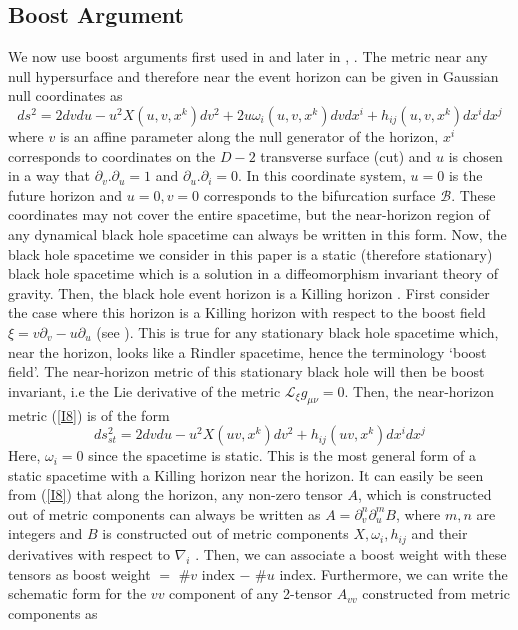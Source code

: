 \documentclass[12pt]{article}
\begin{document}
\subsection{Boost Argument}
We now use boost arguments first used in \cite{Wall} and later in \cite{SPANMS}, \cite{BBDK}.
The metric near any null hypersurface and therefore near the event horizon can be given in Gaussian null coordinates as
\begin{equation}\label{I8}
ds^2= 2dv du -u^2 X(u,v,x^{k}) dv^2 + 2 u \omega_{i}(u,v,x^{k}) dv dx^{i} + h_{ij}(u,v,x^{k})dx^{i} dx^{j}
\end{equation}
where $v$ is an affine parameter along the null generator of the horizon, $x^{i}$ corresponds to coordinates on the $D-2$ transverse surface (cut) and $u$ is chosen in a way that $\partial_v. \partial_u=1$ and $\partial_u. \partial_i=0$. In this coordinate system, $u=0$ is the future horizon and $u=0, v=0$ corresponds to the bifurcation surface $\mathcal{B}$. These coordinates may not cover the entire spacetime, but the near-horizon region of any dynamical black hole spacetime can always be written in this form. Now, the black hole spacetime we consider in this paper is a static (therefore stationary) black hole spacetime which is a solution in a diffeomorphism invariant theory of gravity. Then, the black hole event horizon is a Killing horizon \cite{Wald}. First consider the case where this horizon is a Killing horizon with respect to the boost field $\xi= v\partial_v - u\partial_u $ (see \cite{SPANMS}). This is true for any stationary black hole spacetime which, near the horizon, looks like a Rindler spacetime, hence the terminology `boost field'. The near-horizon metric of this stationary black hole will then be boost invariant, i.e the Lie derivative of the metric $\mathcal{L}_{\xi} g_{\mu \nu}=0$.
Then, the near-horizon metric (\ref{I8}) is of the form
\begin{equation}\label{I9}
ds^2_{st}= 2dv du -u^2 X(uv,x^{k}) dv^2 + h_{ij}(uv,x^{k})dx^{i} dx^{j}
\end{equation}
Here, $\omega_{i} = 0$ since the spacetime is static.
This is the most general form of a static spacetime with a Killing horizon near the horizon.
It can easily be seen from (\ref{I8}) that along the horizon, any non-zero tensor $A$, which is constructed out of metric components can always be written as $A=\partial^n_v \partial^m_u B$, where $m,n$ are integers and $B$ is constructed out of metric components $X,\omega_i,h_{ij} $ and their derivatives with respect to $\nabla_i$ . Then, we can associate a boost weight with these tensors as boost weight $=$ $\#v$ index $-$ $\#u$ index. Furthermore, we can write the schematic form  for the $vv$ component of any 2-tensor $A_{vv}$ constructed from metric components as
\end{document}
